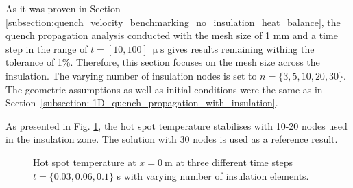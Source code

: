 
As it was proven in Section \ref{subsection:quench_velocity_benchmarking_no_insulation_heat_balance}, the quench propagation analysis conducted with the mesh size of 1 mm and a time step in the range of $t=[10, 100]~\upmu \text{s}$ gives results remaining withing the tolerance of 1\%. Therefore, this section focuses on the mesh size across the insulation. The varying number of insulation nodes is set to $n=\{3, 5, 10, 20, 30\}$. The geometric assumptions as well as initial conditions were the same as in Section~\ref{subsection: 1D_quench_propagation_with_insulation}. 

As presented in Fig. \ref{fig: q_vel_modelling_v_quench_hot_spot_temp_with_insulation}, the hot spot temperature stabilises with 10-20 nodes used in the insulation zone. The solution with 30 nodes is used as a reference result. 

\begin{figure}[H]
\centering
    \caption{Hot spot temperature at $x = 0~\text{m}$ at three different time steps $t=\{0.03, 0.06, 0.1\}$ s with varying number of insulation elements.}
    \label{fig: q_vel_modelling_v_quench_hot_spot_temp_with_insulation}
\end{figure}

